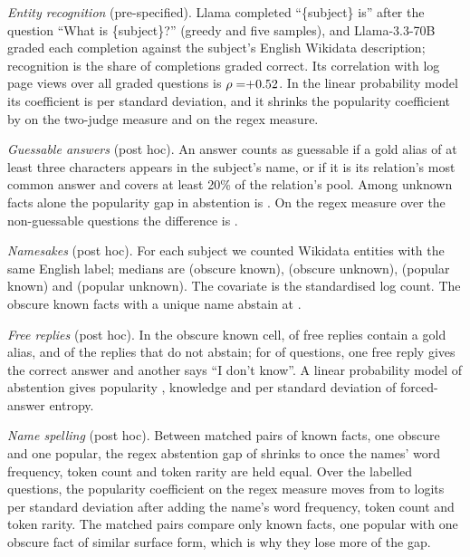 \documentclass{article}
\newcommand{\idk}{``I don't know''}
\begin{document}
\emph{Entity recognition} (pre-specified). Llama completed ``\{subject\} is'' after the question ``What is \{subject\}?'' (greedy and five samples), and Llama-3.3-70B graded each completion against the subject's English Wikidata description; recognition is the share of completions graded correct. Its correlation with log page views over all graded questions is $\rho=\ekRho$. In the linear probability model its coefficient is \ekCoef{} \ekCoefCI{} per standard deviation, and it shrinks the popularity coefficient by \ekShrink{} on the two-judge measure and \ekShrinkRegex{} on the regex measure.

\emph{Guessable answers} (post hoc). An answer counts as guessable if a gold alias of at least three characters appears in the subject's name, or if it is its relation's most common answer and covers at least 20\% of the relation's pool. Among unknown facts alone the popularity gap in abstention is \hmLlamaPopUnkOnly{} \hmLlamaPopUnkOnlyCI. On the regex measure over the \gsRegexN{} non-guessable questions the difference is \gsRegexDiff{} \gsRegexDiffCI.

\emph{Namesakes} (post hoc). For each subject we counted Wikidata entities with the same English label; medians are \amObsKnownHom{} (obscure known), \amObsUnkHom{} (obscure unknown), \amPopKnownHom{} (popular known) and \amPopUnkHom{} (popular unknown). The covariate is the standardised log count. The \amSingleN{} obscure known facts with a unique name abstain at \amSingle.

\emph{Free replies} (post hoc). In the obscure known cell, \rcObsKnownCorrect{} of free replies contain a gold alias, and \rcObsKnownNonAbsCorrect{} of the replies that do not abstain; for \rcBothN{} of \rcBothOf{} questions, one free reply gives the correct answer and another says \idk. A linear probability model of abstention gives popularity \rcPopEnt{} \rcPopEntCI, knowledge \rcKnowEnt{} \rcKnowEntCI{} and \rcEntCoef{} per standard deviation of forced-answer entropy.

\emph{Name spelling} (post hoc). Between \scPopKnownPairs{} matched pairs of known facts, one obscure and one popular, the regex abstention gap of \scPopKnownGap{} shrinks to \scPopKnownGapSurface{} \scPopKnownGapSurfaceCI{} once the names' word frequency, token count and token rarity are held equal. Over the \faLlamaN{} labelled questions, the popularity coefficient on the regex measure moves from \scPoolPop{} to \scPoolPopSurface{} logits per standard deviation after adding the name's word frequency, token count and token rarity. The matched pairs compare only known facts, one popular with one obscure fact of similar surface form, which is why they lose more of the gap.
\end{document}
